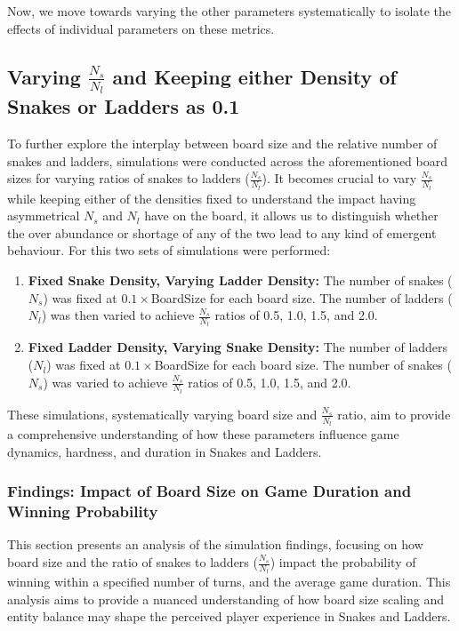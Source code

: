 Now, we move towards varying the other parameters systematically to isolate the effects of individual parameters on these metrics.

\subsection{Varying $\frac{N_s}{N_l}$ and Keeping either Density of Snakes or Ladders as 0.1} 
To further explore the interplay between board size and the relative number of snakes and ladders, simulations were conducted across the aforementioned board sizes for varying ratios of snakes to ladders ($\frac{N_s}{N_l}$). It becomes crucial to vary $\frac{N_s}{N_l}$ while keeping either of the densities fixed to understand the impact having asymmetrical ${N_s}$ and $N_l$ have on the board, it allows us to distinguish whether the over abundance or shortage of any of the two lead to any kind of emergent behaviour. For this two sets of simulations were performed:

\begin{enumerate}
	\item \textbf{Fixed Snake Density, Varying Ladder Density:} The number of snakes ($N_s$) was fixed at $0.1 \times$BoardSize for each board size. The number of ladders ($N_l$) was then varied to achieve $\frac{N_s}{N_l}$ ratios of 0.5, 1.0, 1.5, and 2.0.
	\item \textbf{Fixed Ladder Density, Varying Snake Density:} The number of ladders ($N_l$) was fixed at $0.1 \times$BoardSize for each board size. The number of snakes ($N_s$) was varied to achieve $\frac{N_s}{N_l}$ ratios of 0.5, 1.0, 1.5, and 2.0.
\end{enumerate}

These simulations, systematically varying board size and $\frac{N_s}{N_l}$ ratio, aim to provide a comprehensive understanding of how these parameters influence game dynamics, hardness, and duration in Snakes and Ladders.

\subsubsection{Findings: Impact of Board Size on Game Duration and Winning Probability}

This section presents an analysis of the simulation findings, focusing on how board size and the ratio of snakes to ladders ($\frac{N_s}{N_l}$) impact the probability of winning within a specified number of turns, and the average game duration.  This analysis aims to provide a nuanced understanding of how board size scaling and entity balance may shape the perceived player experience in Snakes and Ladders.

